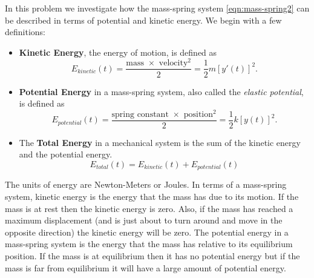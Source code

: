 In this problem we investigate how the mass-spring system \eqref{eqn:mass-spring2} can be
described in terms of potential and kinetic energy.  We begin with a few definitions:
\begin{itemize}
    \item {\bf Kinetic Energy}, the energy of motion, is defined as
        \[ E_{kinetic}(t) = \frac{\text{mass $\times$ velocity$^2$}}{2} = \frac{1}{2} m
            \left[ y'(t)\right]^2. \]
    \item {\bf Potential Energy} in a mass-spring system, also called the {\it
            elastic potential}, is defined as
            \[ E_{potential}(t) = \frac{\text{spring constant $\times$ position$^2$}}{2} =
                \frac{1}{2} k \left[ y(t) \right]^2. \]
    \item The {\bf Total Energy} in a mechanical system is the sum of the
                kinetic energy and the potential energy.
                \[ E_{total}(t) = E_{kinetic}(t) + E_{potential}(t) \]
\end{itemize}
The units of energy are Newton-Meters or Joules.  In terms of a mass-spring system, kinetic energy is the
energy that the mass has due to its motion.  If the mass is at rest then the kinetic
energy is zero.  Also, if the mass has reached a maximum displacement (and is just about
to turn around and move in the opposite direction) the kinetic energy will be zero. The
potential energy in a mass-spring system is the energy that the mass has relative to its
equilibrium position.  If the mass is at equilibrium then it has no potential energy but
if the mass is far from equilibrium it will have a large amount of potential energy.  

